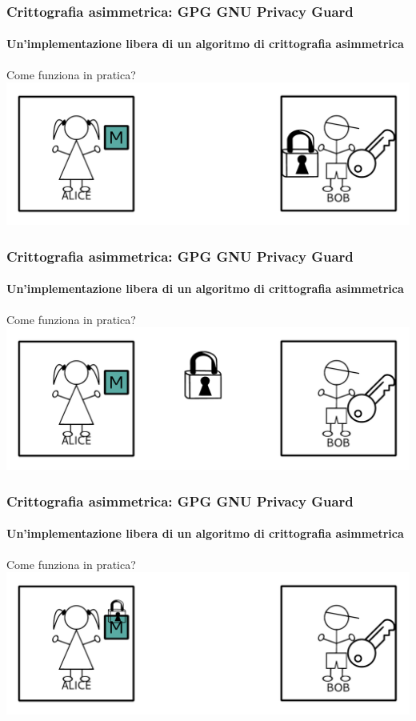 \documentclass{beamer}
\begin{document}
\begin{frame}
  \frametitle{Crittografia asimmetrica: GPG GNU Privacy Guard}
  \framesubtitle{Un'implementazione libera di un algoritmo di crittografia asimmetrica}

  \begin{block}{Come funziona in pratica?}
    \centering
    \includegraphics[width=.9\linewidth]{ab1.pdf}
  \end{block}
\end{frame}

\begin{frame}
  \frametitle{Crittografia asimmetrica: GPG GNU Privacy Guard}
  \framesubtitle{Un'implementazione libera di un algoritmo di crittografia asimmetrica}

  \begin{block}{Come funziona in pratica?}
    \centering
    \includegraphics[width=.9\linewidth]{ab2.pdf}
  \end{block}
\end{frame}

\begin{frame}
  \frametitle{Crittografia asimmetrica: GPG GNU Privacy Guard}
  \framesubtitle{Un'implementazione libera di un algoritmo di crittografia asimmetrica}

  \begin{block}{Come funziona in pratica?}
    \centering
    \includegraphics[width=.9\linewidth]{ab3.pdf}
  \end{block}
\end{frame}
\end{document}
